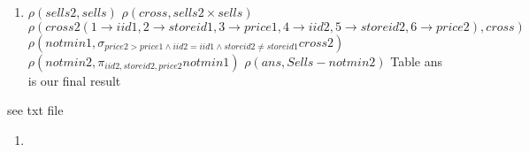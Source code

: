 \documentclass{4320hw}
\begin{document}
\begin{exercises}
\begin{enumerate}
\item
$\rho(sells2, sells)$
\newline
$\rho(cross, sells2 \times sells)$
\newline
$\rho(cross2(1 \rightarrow iid1, 2 \rightarrow storeid1, 3 \rightarrow price1, 4 \rightarrow iid2, 5 \rightarrow storeid2, 6 \rightarrow price2), cross)$
\newline
$\rho(notmin1, \sigma_{price2>price1 \wedge iid2=iid1 \wedge storeid2 \neq storeid1} cross2 )$
\newline
$\rho(notmin2, \pi_{iid2, storeid2, price2} notmin1)$
\newline
$\rho(ans, Sells-notmin2)$
\newline
Table ans is our final result
\end{enumerate}

\item
see txt file

\item
\begin{enumerate}
\item

\end{enumerate}

\end{exercises}
\end{document}
